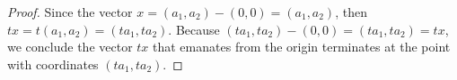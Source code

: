 \begin{Exercise}
	\begin{proof}
		Since the vector $x = (a_1,a_2)-(0,0) = (a_1,a_2)$, then $t x = t(a_1,a_2) = (t a_1, t a_2)$. Because $(t a_1, t a_2) - (0,0) = (t a_1, t a_2) = t x$, we conclude the vector $t x$ that emanates from the origin terminates at the point with coordinates $(t a_1, t a_2)$.
	\end{proof}
\end{Exercise}